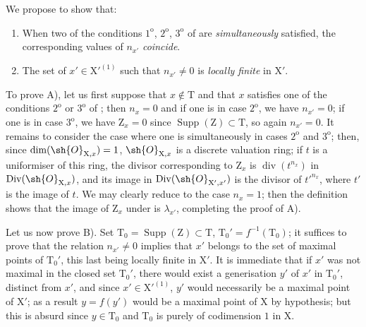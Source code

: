 \begin{env}[21.10.2]
\label{IV.21.10.2}
We propose to show that:
\begin{enumerate}[label=\emph{\Alph*)}]
  \item When two of the conditions $1^{\mathrm{o}}$, $2^{\mathrm{o}}$, $3^{\mathrm{o}}$ of  are \emph{simultaneously} satisfied, the corresponding values of $n_{x'}$ \emph{coincide}.
  \item The set of $x'\in\mathrm{X}'^{(1)}$ such that $n_{x'}\neq 0$ is \emph{locally finite} in $\mathrm{X}'$.
\end{enumerate}

To prove A), let us first suppose that $x\notin\mathrm{T}$ and that $x$ satisfies one of the conditions $2^{\mathrm{o}}$ or $3^{\mathrm{o}}$ of ; then $n_x=0$ and if one is in case $2^{\mathrm{o}}$, we have $n_{x'}=0$; if one is in case $3^{\mathrm{o}}$, we have $\mathrm{Z}_x=0$ since $\operatorname{Supp}(\mathrm{Z})\subset\mathrm{T}$, so again $n_{x'}=0$.
It remains to consider the case where one is simultaneously in cases $2^{\mathrm{o}}$ and $3^{\mathrm{o}}$; then, since $\dim(\sh{O}_{\mathrm{X},x})=1$, $\sh{O}_{\mathrm{X},x}$ is a discrete valuation ring; if $t$ is a uniformiser of this ring, the divisor corresponding to $\mathrm{Z}_x$ is $\operatorname{div}(t^{n_x})$ in $\operatorname{Div}(\sh{O}_{\mathrm{X},x})$, and its image in $\operatorname{Div}(\sh{O}_{\mathrm{X}',x'})$ is the divisor of $t'^{n_x}$, where $t'$ is the image of $t$.
We may clearly reduce to the case $n_x=1$; then the definition  shows that the image of $\mathrm{Z}_x$ under  is $\lambda_{x'}$, completing the proof of A).

Let us now prove B).
Set $\mathrm{T}_0=\operatorname{Supp}(\mathrm{Z})\subset\mathrm{T}$, $\mathrm{T}_0'=f^{-1}(\mathrm{T}_0)$; it suffices to prove that the relation $n_{x'}\neq 0$ implies that $x'$ belongs to the set of maximal points of $\mathrm{T}_0'$, this last being locally finite in $\mathrm{X}'$.
It is immediate that if $x'$ was not maximal in the closed set $\mathrm{T}_0'$, there would exist
a generisation $y'$ of $x'$ in $\mathrm{T}_0'$, distinct from $x'$, and since $x'\in\mathrm{X}'^{(1)}$, $y'$ would necessarily be a maximal point of $\mathrm{X}'$; as a result $y=f(y')$ would be a maximal point of $\mathrm{X}$ by hypothesis; but this is absurd since $y\in\mathrm{T}_0$ and $\mathrm{T}_0$ is purely of codimension $1$ in $\mathrm{X}$.
\end{env}

